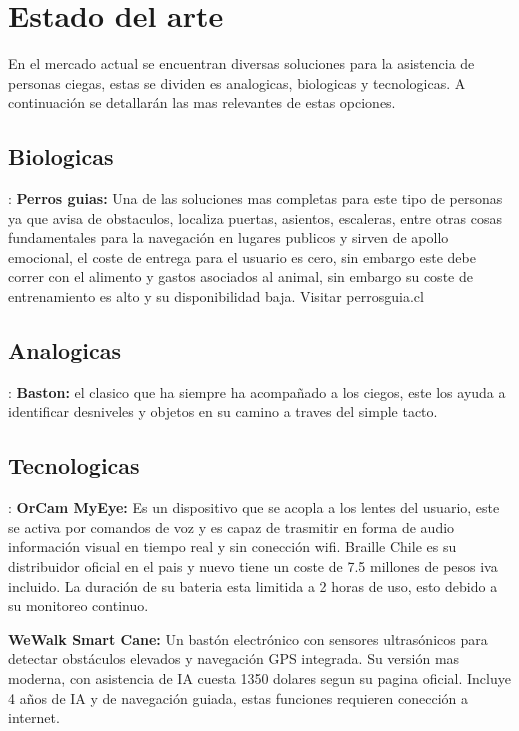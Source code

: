 \documentclass{article}
\begin{document}
    \newpage
    \section{Estado del arte}
    En el mercado actual se encuentran diversas soluciones para la asistencia de personas ciegas, estas se dividen es analogicas, biologicas y tecnologicas. A continuación se detallarán las mas relevantes de estas opciones.
    
        \subsection{Biologicas}:
            \textbf{Perros guias:} Una de las soluciones mas completas para este tipo de personas ya que avisa de obstaculos, localiza puertas, asientos, escaleras, entre otras cosas fundamentales para la navegación en lugares publicos y sirven de apollo emocional,
            el coste de entrega para el usuario es cero, sin embargo este debe correr con el alimento y gastos asociados al animal, sin embargo su coste de entrenamiento es alto y su disponibilidad baja.  Visitar perrosguia.cl

        \subsection{Analogicas}:
            \textbf{Baston:} el clasico que ha siempre ha acompañado a los ciegos, este los ayuda a identificar desniveles y objetos en su camino a traves del simple tacto.

        \subsection{Tecnologicas}:
            \textbf{OrCam MyEye:} Es un dispositivo que se acopla a los lentes del usuario, este se activa por comandos de voz y es capaz de trasmitir en forma de audio información visual en tiempo real y sin conección wifi. Braille Chile es su distribuidor oficial en el pais y nuevo tiene un coste de 7.5 millones de pesos iva incluido.
            La duración de su bateria esta limitida a 2 horas de uso, esto debido a su monitoreo continuo.

            \textbf{WeWalk Smart Cane:} Un bastón electrónico con sensores ultrasónicos para detectar obstáculos elevados y navegación GPS integrada. Su versión mas moderna, con asistencia de IA cuesta 1350 dolares segun su pagina oficial. Incluye 4 años de IA y de navegación guiada, estas funciones requieren conección a internet.
\end{document}
